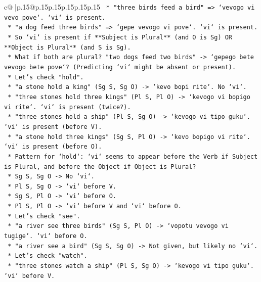 \documentclass{article}
\begin{document}
{\begin{supertabular}{c@{$\;$}|p{.15\linewidth}@{}p{.15\linewidth}p{.15\linewidth}p{.15\linewidth}p{.15\linewidth}p{.15\linewidth}}
{{{\texttt{                *   "three birds feed a bird" => `vevogo vi vevo pove`. `vi` is present.} \\
\texttt{                *   "a dog feed three birds" => `gepe vevogo vi pove`. `vi` is present.} \\
\texttt{                *   So `vi` is present if **Subject is Plural** (and O is Sg) OR **Object is Plural** (and S is Sg).} \\
\texttt{                *   What if both are plural? "two dogs feed two birds" {-}> `gepego bete vevogo bete pove`? (Predicting `vi` might be absent or present).} \\
\texttt{        *   Let's check "hold".} \\
\texttt{            *   "a stone hold a king" (Sg S, Sg O) {-}> `kevo bopi rite`. No `vi`.} \\
\texttt{            *   "three stones hold three kings" (Pl S, Pl O) {-}> `kevogo vi bopigo vi rite`. `vi` is present (twice?).} \\
\texttt{            *   "three stones hold a ship" (Pl S, Sg O) {-}> `kevogo vi tipo guku`. `vi` is present (before V).} \\
\texttt{            *   "a stone hold three kings" (Sg S, Pl O) {-}> `kevo bopigo vi rite`. `vi` is present (before O).} \\
\texttt{            *   Pattern for `hold`: `vi` seems to appear before the Verb if Subject is Plural, and before the Object if Object is Plural?} \\
\texttt{                *   Sg S, Sg O {-}> No `vi`.} \\
\texttt{                *   Pl S, Sg O {-}> `vi` before V.} \\
\texttt{                *   Sg S, Pl O {-}> `vi` before O.} \\
\texttt{                *   Pl S, Pl O {-}> `vi` before V and `vi` before O.} \\
\texttt{        *   Let's check "see".} \\
\texttt{            *   "a river see three birds" (Sg S, Pl O) {-}> `vopotu vevogo vi tugige`. `vi` before O.} \\
\texttt{            *   "a river see a bird" (Sg S, Sg O) {-}> Not given, but likely no `vi`.} \\
\texttt{        *   Let's check "watch".} \\
\texttt{            *   "three stones watch a ship" (Pl S, Sg O) {-}> `kevogo vi tipo guku`. `vi` before V.} \\
}}}
\end{supertabular}}
\end{document}
